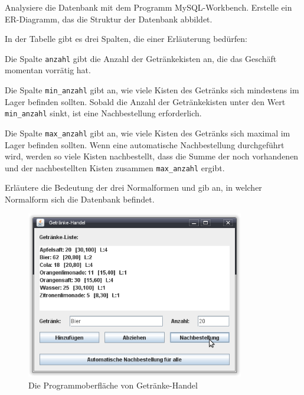 \begin{compactenum}[a)]
\item Analysiere die Datenbank mit dem Programm MySQL-Workbench. Erstelle ein
ER-Diagramm, das die Struktur der Datenbank abbildet.

In der Tabelle  gibt es drei Spalten, die einer Erläuterung
bedürfen:

\begin{compactitem}
\item Die Spalte \verb|anzahl| gibt die Anzahl der Getränkekisten an, die
das Geschäft momentan vorrätig hat.
\item Die Spalte \verb|min_anzahl| gibt an, wie viele Kisten des Getränks sich
mindestens im Lager befinden sollten. Sobald die Anzahl der Getränkekisten
unter den Wert \verb|min_anzahl| sinkt, ist eine Nachbestellung erforderlich.
\item Die Spalte \verb|max_anzahl| gibt an, wie viele Kisten des Getränks sich
maximal im Lager befinden sollten. Wenn eine automatische Nachbestellung durchgeführt
wird, werden so viele Kisten nachbestellt, dass die Summe der noch vorhandenen
und der nachbestellten Kisten zusammen \verb|max_anzahl| ergibt.
\end{compactitem}

\item Erläutere die Bedeutung der drei Normalformen und gib an, in welcher
Normalform sich die Datenbank befindet.

\begin{figure}[h]
 \centering
 \includegraphics[width=0.85\textwidth]{./inf/SEKII/38_JavaSQL_Wiederholung/GetraenkeHandelAufgabe6.png}
 \caption{Die Programmoberfläche von \glqq Getränke-Handel\grqq}
 \label{fig:getraenkehandel}
\end{figure}


\end{compactenum}
